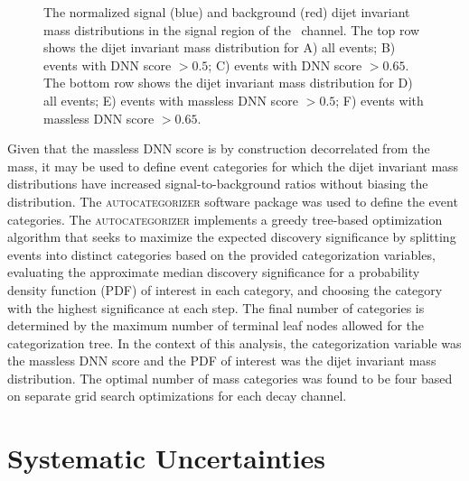 \begin{figure}[htbp]
{    
  }
  \caption[Background Sculpting Mitigation]{The normalized signal (blue) and background (red) dijet invariant mass distributions in the signal region of the \ZnnH\ channel. The top row shows the dijet invariant mass distribution for A) all events; B) events with DNN score $> 0.5$; C) events with DNN score $> 0.65$. The bottom row shows the dijet invariant mass distribution for D) all events; E) events with massless DNN score $> 0.5$; F) events with massless DNN score $> 0.65$.}
  \label{fig:sculptcheck}
\end{figure}

Given that the massless DNN score is by construction decorrelated from the mass, it may be used to define event categories for which the dijet invariant mass distributions have increased signal-to-background ratios without biasing the distribution. The \textsc{autocategorizer}\cite{AUTOCATEGORIZER} software package was used to define the event categories. The \textsc{autocategorizer} implements a greedy tree-based optimization algorithm that seeks to maximize the expected discovery significance by splitting events into distinct categories based on the provided categorization variables, evaluating the approximate median discovery significance\cite{ASIMOVSIG} for a probability density function (PDF) of interest in each category, and choosing the category with the highest significance at each step. The final number of categories is determined by the maximum number of terminal leaf nodes allowed for the categorization tree. In the context of this analysis, the categorization variable was the massless DNN score and the PDF of interest was the dijet invariant mass distribution. The optimal number of mass categories was found to be four based on separate grid search optimizations for each decay channel.

\section{Systematic Uncertainties}

